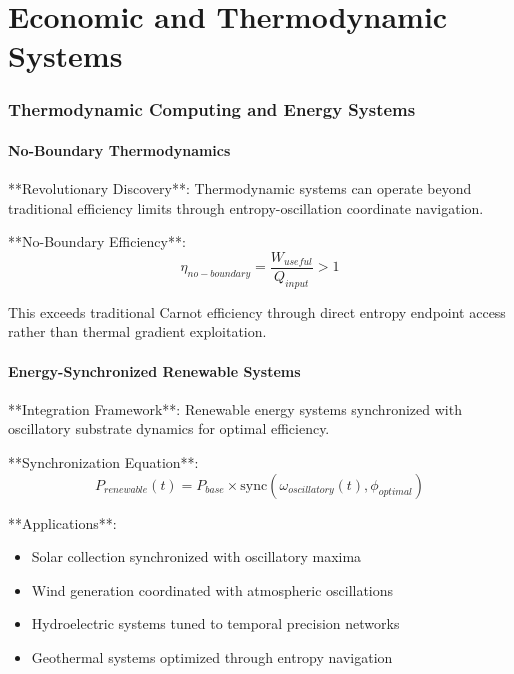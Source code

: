\documentclass[12pt,a4paper]{article}
\theoremstyle{remark}
\begin{document}
\part{Economic and Thermodynamic Systems}

\section{Thermodynamic Computing and Energy Systems}

\subsection{No-Boundary Thermodynamics}

**Revolutionary Discovery**: Thermodynamic systems can operate beyond traditional efficiency limits through entropy-oscillation coordinate navigation.

**No-Boundary Efficiency**:
\begin{equation}
\eta_{no-boundary} = \frac{W_{useful}}{Q_{input}} > 1
\end{equation}

This exceeds traditional Carnot efficiency through direct entropy endpoint access rather than thermal gradient exploitation.

\subsection{Energy-Synchronized Renewable Systems}

**Integration Framework**: Renewable energy systems synchronized with oscillatory substrate dynamics for optimal efficiency.

**Synchronization Equation**:
\begin{equation}
P_{renewable}(t) = P_{base} \times \text{sync}(\omega_{oscillatory}(t), \phi_{optimal})
\end{equation}

**Applications**:
\begin{itemize}
\item Solar collection synchronized with oscillatory maxima
\item Wind generation coordinated with atmospheric oscillations
\item Hydroelectric systems tuned to temporal precision networks
\item Geothermal systems optimized through entropy navigation
\end{itemize}
\end{document}
